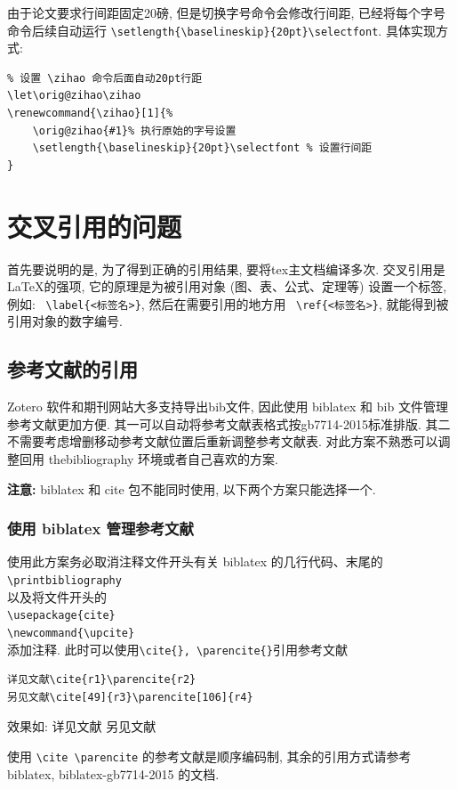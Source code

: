 由于论文要求行间距固定20磅, 但是切换字号命令会修改行间距, 已经将每个字号命令后续自动运行 \verb|\setlength{\baselineskip}{20pt}\selectfont|. 具体实现方式:
\begin{lstlisting}
% 设置 \zihao 命令后面自动20pt行距
\let\orig@zihao\zihao
\renewcommand{\zihao}[1]{%
    \orig@zihao{#1}% 执行原始的字号设置
    \setlength{\baselineskip}{20pt}\selectfont % 设置行间距
}
\end{lstlisting}

\section{交叉引用的问题}
首先要说明的是, 为了得到正确的引用结果, 要将tex主文档编译多次. 交叉引用是\LaTeX 的强项, 它的原理是为被引用对象 (图、表、公式、定理等) 设置一个标签, 例如: ~\verb|\label{<标签名>}|, 然后在需要引用的地方用 ~\verb|\ref{<标签名>}|, 就能得到被引用对象的数字编号.
\subsection{参考文献的引用}
Zotero 软件和期刊网站大多支持导出bib文件, 因此使用 biblatex 和 bib 文件管理参考文献更加方便. 其一可以自动将参考文献表格式按gb7714-2015标准排版. 其二不需要考虑增删移动参考文献位置后重新调整参考文献表. 对此方案不熟悉可以调整回用 {thebibliography} 环境或者自己喜欢的方案.

{\bfseries 注意: } biblatex 和 cite 包不能同时使用, 以下两个方案只能选择一个.

\subsubsection{使用 biblatex 管理参考文献}
使用此方案务必取消注释文件开头有关 biblatex 的几行代码、末尾的\\
\verb|\printbibliography|\\
以及将文件开头的\\
\verb|\usepackage{cite}|\\
\verb|\newcommand{\upcite}|\\
添加注释. 此时可以使用\verb|\cite{}, \parencite{}|引用参考文献

\begin{lstlisting}
详见文献\cite{r1}\parencite{r2}
另见文献\cite[49]{r3}\parencite[106]{r4}
\end{lstlisting}
效果如:
详见文献\cite{r1}\parencite{r2}
另见文献\cite[49]{r3}\parencite[106]{r4}

使用 \verb|\cite \parencite| 的参考文献是顺序编码制, 其余的引用方式请参考 biblatex, biblatex-gb7714-2015 的文档.

